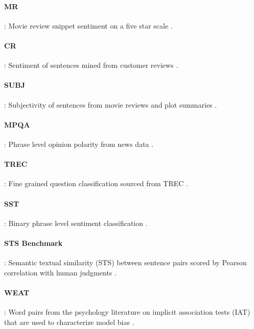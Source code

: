 \documentclass[11pt,a4paper]{article}
\begin{document}
\paragraph{MR}: Movie review snippet sentiment on a five star scale \cite{pang2005}.

\paragraph{CR}: Sentiment of sentences mined from customer reviews \cite{hu2004}.  

\paragraph{SUBJ}: Subjectivity of sentences from movie reviews and plot summaries \cite{pang2004}.

\paragraph{MPQA}: Phrase level opinion polarity from news data \cite{wiebe2005}.

\paragraph{TREC}: Fine grained question classification sourced from TREC \cite{li2002}.


\paragraph{SST}:  Binary phrase level sentiment classification \cite{socher2013}.

\paragraph{STS Benchmark}: Semantic textual similarity (STS) between sentence pairs scored by Pearson correlation with human judgments \cite{cer2017}.

\paragraph{WEAT}: Word pairs from the psychology literature on implicit association tests (IAT) that are used to characterize model bias \cite{caliskan183}.
\end{document}
